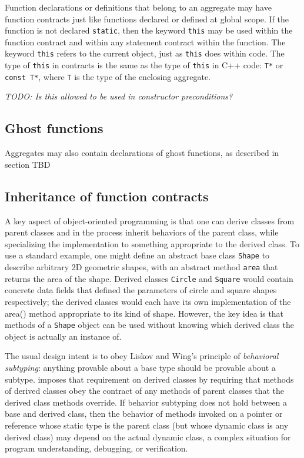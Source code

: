 Function declarations or definitions that belong to an aggregate may have function
contracts just like functions declared or defined at global scope. If the function is not declared \lstinline|static|, then
the keyword \lstinline|this| may be used within the function
contract and within any statement contract within the 
function. The keyword \lstinline|this| refers to the current
object, just as \lstinline|this| does within \lang{} code.
The type of \lstinline|this| in contracts is the same as the type of \lstinline|this| in C++ code: \lstinline|T*| or \lstinline|const T*|, where \lstinline|T| is the type of the enclosing aggregate.

\emph{TODO: Is this allowed to be used in constructor preconditions?}

\subsection{Ghost functions}
Aggregates may also contain declarations of ghost functions, as described in section TBD 


\subsection{Inheritance of function contracts}

A key aspect of object-oriented programming is 
that one can derive classes from parent classes and in 
the process inherit behaviors of the parent class, 
while specializing the implementation to something appropriate to the derived class. 
To use a standard example, 
one might define an abstract base class \lstinline|Shape| to describe arbitrary 2D geometric shapes, 
with an abstract method 
\lstinline|area| that returns the area of the shape. 
Derived classes \lstinline|Circle| and \lstinline|Square| would contain concrete data fields that defined the parameters of circle and square shapes respectively; 
the derived classes would each have its own implementation of the area() method appropriate to its kind of shape. 
However, the key idea is that methods of a \lstinline|Shape| object can be used without knowing which derived class the object is actually an instance of.

The usual design intent is to obey Liskov and Wing's principle of \textit{behavioral subtyping}\cite{Liskov:1994:BNS:197320.197383}: 
anything provable about a base type should be provable about a subtype.
\NAME{} imposes that requirement on derived classes by 
requiring that methods of derived classes obey the contract of any methods of parent classes that the derived class methods override. 
If behavior subtyping does not hold between a base and derived class, then the behavior of methods
invoked on a pointer or reference whose static type is the
parent class (but whose dynamic class is any derived class) may depend on the actual dynamic class, 
a complex situation for program understanding, debugging, or verification.

